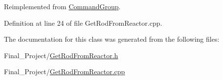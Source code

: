 Reimplemented from \hyperlink{classCommandGroup_a28ad3a1c2f6b4f9aea10efa1a824895e}{Command\-Group}.



Definition at line 24 of file Get\-Rod\-From\-Reactor.\-cpp.



The documentation for this class was generated from the following files\-:\begin{DoxyCompactItemize}
\item 
Final\-\_\-\-Project/\hyperlink{GetRodFromReactor_8h}{Get\-Rod\-From\-Reactor.\-h}\item 
Final\-\_\-\-Project/\hyperlink{GetRodFromReactor_8cpp}{Get\-Rod\-From\-Reactor.\-cpp}\end{DoxyCompactItemize}

